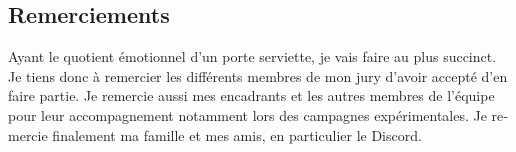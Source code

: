 \begin{otherlanguage}{french}

	\chapter{Remerciements}

	Ayant le quotient émotionnel d'un porte serviette, je vais faire au plus succinct. Je tiens donc à
	remercier les différents membres de mon jury d'avoir accepté d'en faire partie. Je remercie aussi
	mes encadrants et les autres membres de l'équipe pour leur accompagnement notamment lors des
	campagnes expérimentales. Je remercie finalement ma famille et mes amis, en particulier le Discord.

\end{otherlanguage}